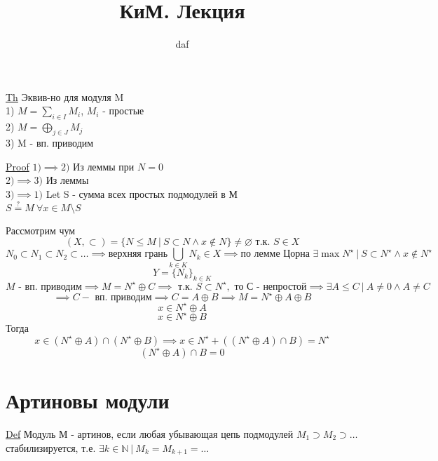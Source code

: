 \documentclass[a4paper]{article}
\begin{document}
\title{КиМ. Лекция}
\author{daf}
\maketitle

\begin{tcolorbox}
\underline{Th} Эквив-но для модуля M\\
1) $ M = \sum_{i \in I} M_i $, $ M_i  $ - простые\\
2) $ M = \bigoplus_{j \in J} M_j $\\
3) M - вп. приводим

\underline{Proof} $ 1) \implies 2) $ Из леммы при $ N = 0 $\\
$ 2) \implies 3) $ Из леммы\\
$ 3) \implies 1) $ Let S - сумма всех простых подмодулей в М\\
$ S \stackrel{?}{=} M \ \forall x \in M \setminus S $ 

Рассмотрим чум 
\[
    (X, \subset) = \{ N \leq M \ | \ S \subset N \land x \notin N \} \neq \varnothing
    \text{ т.к. } S \in X
\]
\[
    N_0 \subset N_1 \subset N_2 \subset \dots \implies \text{верхняя грань}
    \bigcup_{k \in K} N_k \in X \implies \text{по лемме Цорна } \exists
    \max N^{\star} \ |\ S \subset N^{\star} \land x \notin N^{\star}
\]
\[
    Y = \{ N_k\}_{k \in K}
\]
\[
    M \text{ - вп. приводим} \implies M = N^{\star}\oplus C \implies
    \text{ т.к. } S \subset N^{\star}, \text{ то С - непростой} \implies
    \exists A \leq C \ | \ A \neq 0 \land A \neq C
\]
\[
    \implies C - \text{ вп. приводим} \implies C = A \oplus B \implies M = 
    N^{\star} \oplus A \oplus B
\]
\[
    x \in N^{\star} \oplus A
\]
\[
    x \in N^{\star} \oplus B
\]
Тогда
\[
    x \in \left( N^{\star} \oplus A\right) \cap \left( N^{\star} \oplus B\right)
    \implies x \in N^{\star} + ((N^{\star} \oplus A) \cap B) = N^{\star}
\]
\[
    (N^{\star} \oplus A) \cap B = 0
\]
\end{tcolorbox}

\section*{\centering Артиновы модули}
\begin{tcolorbox}
\underline{Def} Модуль М - артинов, если любая убывающая цепь подмодулей
$ M_1 \supset M_2 \supset \dots $ стабилизируется, т.е. $ \exists k \in \mathbb{N}
\ | \ M_k = M_{k+1} = \dots$ 
\end{tcolorbox}
\end{document}

